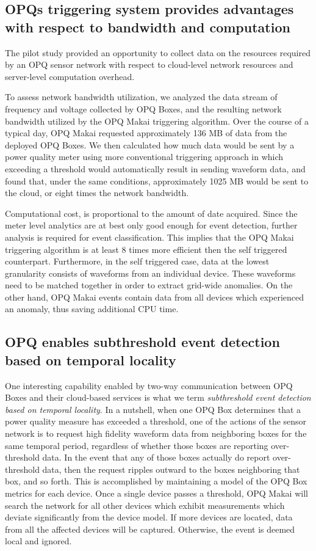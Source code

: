 \subsection{OPQs triggering system provides advantages with respect to bandwidth and computation}

The pilot study provided an opportunity to collect data on the resources required by an OPQ sensor network with respect to cloud-level network resources and server-level computation overhead.

To assess network bandwidth utilization, we analyzed the data stream of frequency and voltage collected by OPQ Boxes, and the resulting network bandwidth utilized by the OPQ Makai triggering algorithm. Over the course of a typical day, OPQ Makai requested approximately 136 MB of data from the deployed OPQ Boxes.  We then calculated how much data would be sent by a power quality meter using more conventional triggering approach in which exceeding a threshold would automatically result in sending waveform data, and found that, under the same conditions, approximately 1025 MB would be sent to the cloud, or eight times the network bandwidth.

Computational cost, is proportional to the amount of date acquired. Since the meter level analytics are at best only good enough for event detection, further analysis is required for event classification.
This implies that the OPQ Makai triggering algorithm is at least 8 times more efficient then the self triggered counterpart.
Furthermore, in the self triggered case, data at the lowest granularity consists of waveforms from an individual device.
These waveforms need to be matched together in order to extract grid-wide anomalies.
On the other hand, OPQ Makai events contain data from all devices which experienced an anomaly, thus saving additional CPU time.

\subsection{OPQ enables subthreshold event detection based on temporal locality}
\label{sec:subthreshold-events}

One interesting capability enabled by two-way communication between OPQ Boxes and their cloud-based services is what we term {\em subthreshold event detection based on temporal locality}.
In a nutshell, when one OPQ Box determines that a power quality measure has exceeded a threshold, one of the actions of the sensor network is to request high fidelity waveform data from neighboring boxes for the same temporal period, regardless of whether those boxes are reporting over-threshold data.
In the event that any of those boxes actually do report over-threshold data, then the request ripples outward to the boxes neighboring that box, and so forth.
This is accomplished by maintaining a model of the OPQ Box metrics for each device.
Once a single device passes a threshold, OPQ Makai will search the network for all other devices which exhibit measurements which deviate significantly from the device model.
If more devices are located, data from all the affected devices will be captured.
Otherwise, the event is deemed local and ignored.

